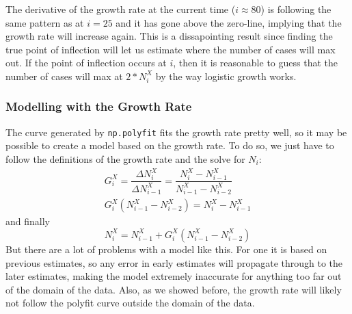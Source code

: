 \documentclass{report}
\begin{document}
            The derivative of the growth rate at the current time ($i \approx 80$) is following the same pattern as at $i = 25$ and it has gone above the zero-line, implying that the growth rate will increase again.
            \newline
            \indent This is a dissapointing result since finding the true point of inflection will let us estimate where the number of cases will max out. If the point of inflection occurs at $i$, then it is reasonable to guess that the number of cases will max at $2 * N^X_i$ by the way logistic growth works.
            \subsubsection{Modelling with the Growth Rate}
            The curve generated by \lstinline{np.polyfit} fits the growth rate pretty well, so it may be possible to create a model based on the growth rate. To do so, we just have to follow the definitions of the growth rate and the solve for $N_i$:
            \begin{align*}
                G^X_i = \dfrac{\Delta N^X_i}{\Delta N^X_{i - 1}} = \dfrac{N^X_i - N^X_{i - 1}}{N^X_{i - 1} - N^X_{i - 2}} \\
                G^X_i(N^X_{i - 1} - N^X_{i - 2}) = N^X_i - N^X_{i - 1}
            \end{align*}
            and finally
            \begin{equation}
                N^X_i = N^X_{i - 1} + G^X_i(N^X_{i - 1} - N^X_{i - 2})
            \end{equation}
            But there are a lot of problems with a model like this. For one it is based on previous estimates, so any error in early estimates will propagate through to the later estimates, making the model extremely inaccurate for anything too far out of the domain of the data.
            \newline
            \indent Also, as we showed before, the growth rate will likely not follow the polyfit curve outside the domain of the data.
\end{document}
